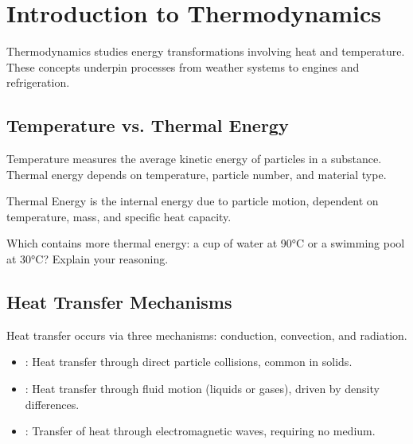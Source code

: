 \FloatBarrier

\section{Introduction to Thermodynamics}
\FloatBarrier

Thermodynamics studies energy transformations involving heat and temperature. These concepts underpin processes from weather systems to engines and refrigeration.

\subsection{Temperature vs. Thermal Energy}
\FloatBarrier

Temperature measures the average kinetic energy of particles in a substance. Thermal energy depends on temperature, particle number, and material type.

\begin{keyconcept}{Thermal Energy}
 is the internal energy due to particle motion, dependent on temperature, mass, and specific heat capacity.
\end{keyconcept}

\begin{stopandthink}
Which contains more thermal energy: a cup of water at 90°C or a swimming pool at 30°C? Explain your reasoning.
\end{stopandthink}

\subsection{Heat Transfer Mechanisms}
\FloatBarrier

Heat transfer occurs via three mechanisms: conduction, convection, and radiation.

\begin{itemize}
\item {}: Heat transfer through direct particle collisions, common in solids.
\item {}: Heat transfer through fluid motion (liquids or gases), driven by density differences.
\item {}: Transfer of heat through electromagnetic waves, requiring no medium.
\end{itemize}


